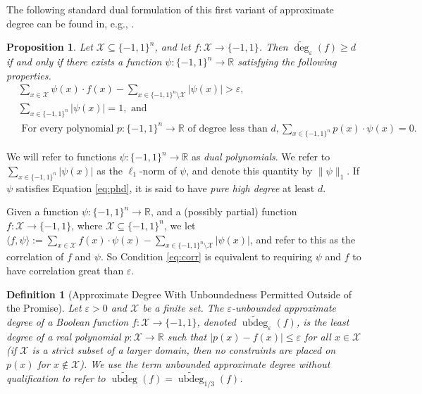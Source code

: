 \documentclass[11pt, letterpaper, fleqn]{article}
\newtheorem{definition}[theorem]{Definition}
\newtheorem{proposition}[theorem]{Proposition}
\theoremstyle{plain}
\newcommand{\genericdomain}{\mathcal{X}}
\newcommand{\reals}{\mathbb{R}}
\newcommand{\R}{\mathbb{R}}
\newcommand{\bits}{\{-1,1\}}
\newcommand{\cX}{\mathcal{X}}
\newcommand{\eps}{\varepsilon}
\newcommand{\adeg}{\widetilde{\operatorname{deg}}}
\newcommand{\ubdeg}{\widetilde{\operatorname{ubdeg}}}
\begin{document}
The following standard dual formulation of this first variant of approximate degree
can be found in, e.g., \cite{bttoc}.

\begin{proposition} \label{prop:duality}
Let $\genericdomain \subseteq \bits^n$, and let $f : \genericdomain \to \{-1,1\}$.
Then $\adeg_{\eps}(f) \geq d$ if and only if there exists a function 
$\psi \colon \bits^n \to \R$ satisfying the following properties.
\begin{align} \label{eq:corr} &\sum_{x \in \genericdomain}\psi(x) \cdot f(x) - \sum_{x \in \bits^n \setminus \genericdomain} |\psi(x)| > \eps, \\
 \label{eq:unitnorm} &\sum_{x \in \bits^n} |\psi(x)| = 1, \text{ and }  \\
 \label{eq:phd} &\text{ For every polynomial } p \colon \bits^n \to \R \text{ of degree less than } d, \sum_{x \in \bits^n} p(x) \cdot \psi(x) = 0. 
\end{align}
\end{proposition}


We will refer to functions $\psi \colon \bits^n \to \reals$ as \emph{dual polynomials}.
We refer to $\sum_{x \in \bits^n} |\psi(x)|$ as the $\ell_1$-norm of $\psi$, and denote this quantity by $\|\psi\|_1$. If $\psi$ satisfies Equation \eqref{eq:phd}, it is said to have \emph{pure high degree} at least $d$.

\medskip Given a function $\psi \colon \bits^n \to \R$, and a (possibly partial)
function $f \colon \genericdomain \to \bits$, where $\genericdomain \subseteq \bits^n$,
we let $\langle f, \psi \rangle := \sum_{x \in \genericdomain} f(x) \cdot \psi(x) - \sum_{x \in \bits^n \setminus \genericdomain} |\psi(x)|$, and refer to this as the correlation of $f$ and $\psi$. So Condition \eqref{eq:corr}
is equivalent to requiring $\psi$ and $f$ to have correlation great than $\eps$.




\begin{definition}[Approximate Degree With Unboundedness Permitted Outside of the Promise]
Let $\eps > 0$ and $\cX$ be a finite set. The $\eps$-\emph{unbounded approximate degree} of a Boolean function $f : \cX \to \bits$, denoted $\ubdeg_\eps(f)$, is the least degree of a real polynomial $p : \cX \to \R$ such that $|p(x) - f(x)| \le \eps$ for all $x \in \cX$ (if $\cX$ is a strict subset of a larger domain, then no constraints are placed on $p(x)$ for $x \not\in \cX$). We use the term \emph{unbounded approximate degree} without qualification to refer to $\ubdeg(f) = \ubdeg_{1/3}(f)$.
\end{definition}
\end{document}
